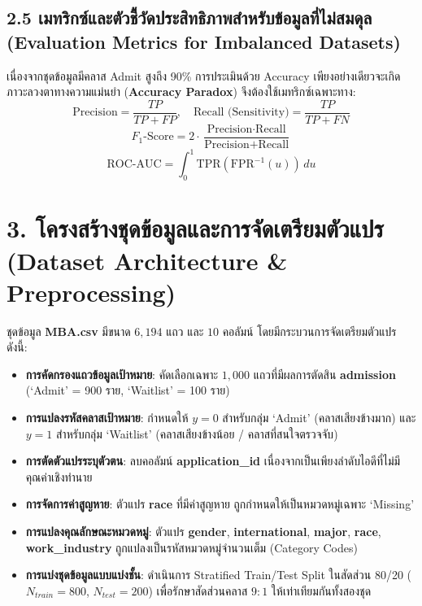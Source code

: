 \documentclass[12pt,a4paper]{article}
\newcommand{\codevar}[1]{\textcolor{codeaccent}{\textbf{#1}}}
\begin{document}
\subsection*{2.5 เมทริกซ์และตัวชี้วัดประสิทธิภาพสำหรับข้อมูลที่ไม่สมดุล\\ \normalsize(Evaluation Metrics for Imbalanced Datasets)}
เนื่องจากชุดข้อมูลมีคลาส Admit สูงถึง 90\% การประเมินด้วย Accuracy เพียงอย่างเดียวจะเกิดภาวะลวงตาทางความแม่นยำ (\textbf{Accuracy Paradox}) จึงต้องใช้เมทริกซ์เฉพาะทาง:
\begin{equation}
    \text{Precision} = \frac{TP}{TP + FP}, \quad \text{Recall (Sensitivity)} = \frac{TP}{TP + FN}
\end{equation}
\begin{equation}
    F_1\text{-Score} = 2 \cdot \frac{\text{Precision} \cdot \text{Recall}}{\text{Precision} + \text{Recall}}
\end{equation}
\begin{equation}
    \text{ROC-AUC} = \int_0^1 \text{TPR}(\text{FPR}^{-1}(u))\,du
\end{equation}

\section*{3. โครงสร้างชุดข้อมูลและการจัดเตรียมตัวแปร\\ \large(Dataset Architecture \& Preprocessing)}

ชุดข้อมูล \codevar{MBA.csv} มีขนาด $6,194$ แถว และ $10$ คอลัมน์ โดยมีกระบวนการจัดเตรียมตัวแปรดังนี้:
\begin{itemize}[leftmargin=18pt, itemsep=2pt]
    \item \textbf{การคัดกรองแถวข้อมูลเป้าหมาย}: คัดเลือกเฉพาะ $1,000$ แถวที่มีผลการตัดสิน \codevar{admission} (`Admit' = 900 ราย, `Waitlist' = 100 ราย)
    \item \textbf{การแปลงรหัสคลาสเป้าหมาย}: กำหนดให้ $y = 0$ สำหรับกลุ่ม `Admit' (คลาสเสียงข้างมาก) และ $y = 1$ สำหรับกลุ่ม `Waitlist' (คลาสเสียงข้างน้อย / คลาสที่สนใจตรวจจับ)
    \item \textbf{การตัดตัวแปรระบุตัวตน}: ลบคอลัมน์ \codevar{application\_id} เนื่องจากเป็นเพียงลำดับไอดีที่ไม่มีคุณค่าเชิงทำนาย
    \item \textbf{การจัดการค่าสูญหาย}: ตัวแปร \codevar{race} ที่มีค่าสูญหาย ถูกกำหนดให้เป็นหมวดหมู่เฉพาะ `Missing'
    \item \textbf{การแปลงคุณลักษณะหมวดหมู่}: ตัวแปร \codevar{gender}, \codevar{international}, \codevar{major}, \codevar{race}, \codevar{work\_industry} ถูกแปลงเป็นรหัสหมวดหมู่จำนวนเต็ม (Category Codes)
    \item \textbf{การแบ่งชุดข้อมูลแบบแบ่งชั้น}: ดำเนินการ Stratified Train/Test Split ในสัดส่วน 80/20 ($N_{train} = 800$, $N_{test} = 200$) เพื่อรักษาสัดส่วนคลาส $9:1$ ให้เท่าเทียมกันทั้งสองชุด
\end{itemize}
\end{document}
